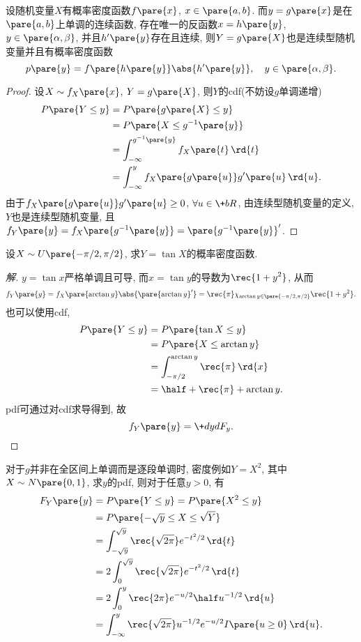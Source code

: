 \documentclass[../Statistics.tex]{subfiles}
\begin{document}
\begin{theorem}[密度变换公式]
    设随机变量$X$有概率密度函数$f\pare{x}$, $x\in \pare{a,b}$. 而$y=g\pare{x}$是在$\pare{a,b}$上单调的连续函数, 存在唯一的反函数$x = h\pare{y}$, $y\in \pare{\alpha,\beta}$, 并且$h'\pare{y}$存在且连续, 则$Y=g\pare{X}$也是连续型随机变量并且有概率密度函数
    \[ p\pare{y} = f\pare{h\pare{y}}\abs{h'\pare{y}},\quad y\in\pare{\alpha,\beta}. \]
\end{theorem}
\begin{proof}
    设$X\sim f_X\pare{x}$, $Y = g\pare{X}$, 则$Y$的cdf(不妨设$g$单调递增)
    \begin{align*}
        P\pare{Y\le y} &= P\pare{g\pare{X} \le y} \\
        &= P\pare{X \le g^{-1}\pare{y}} \\
        &= \int_{-\infty}^{g^{-1}\pare{y}}f_X\pare{t}\,\rd{t} \\
        &= \int_{-\infty}^y f_X\pare{g\pare{u}}g'\pare{u}\,\rd{u}.
    \end{align*}
    由于$f_X\pare{g\pare{u}}g'\pare{u}\ge 0$, $\forall u\in \+bR$, 由连续型随机变量的定义, $Y$也是连续型随机变量, 且$f_Y\pare{y} = f_X\pare{g^{-1}\pare{y}} = \pare{g^{-1}\pare{y}}'$.
\end{proof}
\begin{sample}
    \begin{ex}
        设$X\sim U\pare{-\pi/2,\pi/2}$, 求$Y=\tan X$的概率密度函数.
    \end{ex}
    \begin{proof}[解]
        $y=\tan x$严格单调且可导, 而$x=\tan y$的导数为$\displaystyle \rec{1+y^2}$, 从而
        \[ f_Y\pare{y} = f_X\pare{\arctan y}\abs{\pare{\arctan y}'} = \rec{\pi} \chi_{\arctan y \in \pare{-\pi/2,\pi/2}}\rec{1+y^2}. \]
        也可以使用cdf,
        \begin{align*}
            P\pare{Y\le y} &= P\pare{\tan X \le y} \\
            &= P\pare{X\le \arctan y} \\
            &= \int_{-\pi/2}^{\arctan y}\rec{\pi}\,\rd{x} \\
            &= \half + \rec{\pi}+\arctan y.
        \end{align*}
        pdf可通过对cdf求导得到, 故
        \[ f_Y\pare{y} = \+dyd{F_y}. \qedhere \]
    \end{proof}
\end{sample}
对于$g$并非在全区间上单调而是逐段单调时, 密度例如$Y=X^2$, 其中$X\sim N\pare{0,1}$, 求$y$的pdf, 则对于任意$y>0$, 有
\begin{align*}
    F_Y\pare{y} &= P\pare{Y\le y} = P\pare{X^2 \le y} \\
    &= P\pare{-\sqrt{y} \le X \le \sqrt{Y}} \\
    &= \int_{-\sqrt{y}}^{\sqrt{y}} \rec{\sqrt{2\pi}} e^{-t^2/2}\,\rd{t} \\
    &= 2 \int_0^{\sqrt{y}} \rec{\sqrt{2\pi}}e^{-t^2/2}\,\rd{t} \\
    &= 2 \int_0^y \rec{2\pi} e^{-u/2} \half u^{-1/2}\,\rd{u} \\
    &= \int_{-\infty}^y \rec{\sqrt{2\pi}} u^{-1/2}e^{-u/2}I\pare{u\ge 0}\,\rd{u}.
\end{align*}
\end{document}
